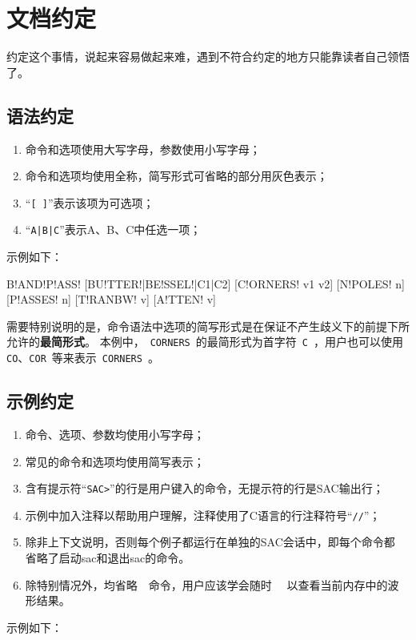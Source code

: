 \section{文档约定}
约定这个事情，说起来容易做起来难，遇到不符合约定的地方只能靠读者自己领悟了。

\subsection*{语法约定}
\begin{enumerate}
\item 命令和选项使用大写字母，参数使用小写字母；
\item 命令和选项均使用全称，简写形式可省略的部分用灰色表示；
\item ``\lstinline{[ ]}''表示该项为可选项；
\item ``\lstinline{A|B|C}''表示A、B、C中任选一项；
\end{enumerate}

示例如下：
\begin{SACSTX}
B!AND!P!ASS! [BU!TTER!|BE!SSEL!|C1|C2] [C!ORNERS! v1 v2] [N!POLES! n] [P!ASSES! n] 
    [T!RANBW! v] [A!TTEN! v]
\end{SACSTX}

需要特别说明的是，命令语法中选项的简写形式是在保证不产生歧义下的前提下所允许的\textbf{最简形式}。
本例中，~\lstinline{CORNERS}~的最简形式为首字符~\lstinline{C}~，用户也可以使用
\lstinline{CO}、\lstinline{COR}~等来表示~\lstinline{CORNERS}~。

\subsection*{示例约定}
\begin{enumerate}
\item 命令、选项、参数均使用小写字母；
\item 常见的命令和选项均使用简写表示；
\item 含有提示符``\lstinline{SAC>}''的行是用户键入的命令，无提示符的行是SAC输出行；
\item 示例中加入注释以帮助用户理解，注释使用了C语言的行注释符号``\lstinline{//}''；
\item 除非上下文说明，否则每个例子都运行在单独的SAC会话中，即每个命令都
    省略了启动sac和退出sac的命令。
\item 除特别情况外，均省略~~命令，用户应该学会随时~~
    以查看当前内存中的波形结果。
\end{enumerate}

示例如下：
